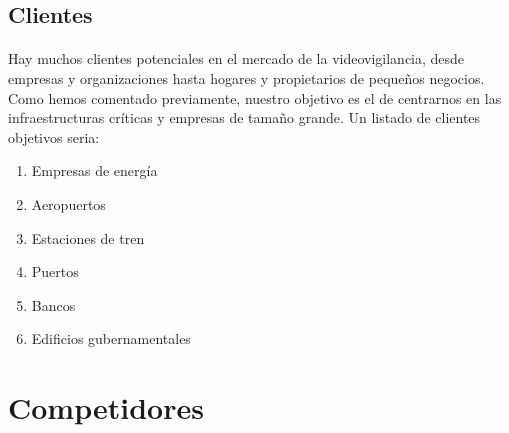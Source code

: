\documentclass{report}
\begin{document}
        \subsection{Clientes}
          \paragraph*{}{
            Hay muchos clientes potenciales en el mercado de la videovigilancia, desde empresas y organizaciones hasta hogares y propietarios de pequeños negocios.
            Como hemos comentado previamente, nuestro objetivo es el de centrarnos en las infraestructuras críticas y empresas de tamaño grande.
            Un listado de clientes objetivos seria:
          }
          \begin{multicols}{2}
            \begin{enumerate}
              \item Empresas de energía
              \item Aeropuertos
              \item Estaciones de tren
              \item Puertos
              \item Bancos
              \item Edificios gubernamentales
            \end{enumerate}
          \end{multicols}
      \clearpage\section{Competidores}
\end{document}
